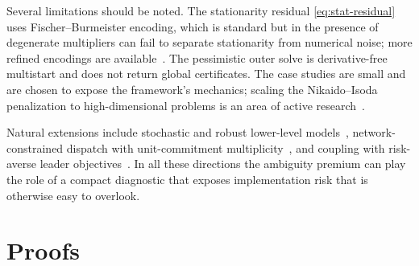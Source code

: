 \documentclass[11pt]{article}
\theoremstyle{definition}
\begin{document}
Several limitations should be noted. The stationarity residual
\eqref{eq:stat-residual} uses Fischer--Burmeister encoding, which
is standard but in the presence of degenerate multipliers can
fail to separate stationarity from numerical noise; more refined
encodings are
available~\cite{kanzow1996nonlinear,kanzow1998new,ralph1995directional}. The
pessimistic outer solve is derivative-free multistart and does
not return global certificates. The case studies are small and
are chosen to expose the framework's mechanics; scaling the
Nikaido--Isoda penalization to high-dimensional problems is an
area of active research~\cite{dreves2016solving}.

Natural extensions include stochastic and robust lower-level
models~\cite{beck2023survey,buchheim2022stochastic,
burtscheidt2020risk}, network-constrained dispatch with
unit-commitment multiplicity~\cite{o2005efficient,bertsimas2012adaptive,pozo2011finding}, and coupling with
risk-averse leader objectives~\cite{rockafellar2000optimization,
artzner1999coherent}. In all these directions the ambiguity premium can
play the role of a compact diagnostic that exposes
implementation risk that is otherwise easy to overlook.

\appendix
\section{Proofs}\label{sec:proofs}
\end{document}
